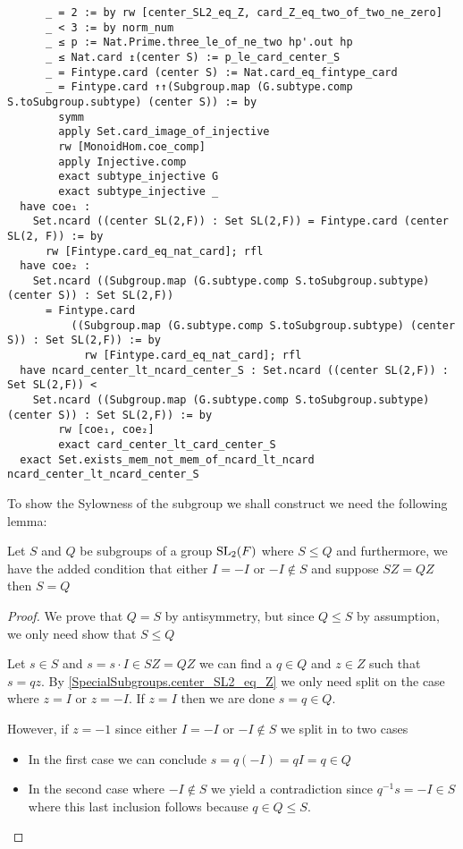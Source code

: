 \begin{tiny}
\begin{verbatim}
      _ = 2 := by rw [center_SL2_eq_Z, card_Z_eq_two_of_two_ne_zero]
      _ < 3 := by norm_num
      _ ≤ p := Nat.Prime.three_le_of_ne_two hp'.out hp
      _ ≤ Nat.card ↥(center S) := p_le_card_center_S
      _ = Fintype.card (center S) := Nat.card_eq_fintype_card
      _ = Fintype.card ↑↑(Subgroup.map (G.subtype.comp S.toSubgroup.subtype) (center S)) := by
        symm
        apply Set.card_image_of_injective
        rw [MonoidHom.coe_comp]
        apply Injective.comp
        exact subtype_injective G
        exact subtype_injective _
  have coe₁ :
    Set.ncard ((center SL(2,F)) : Set SL(2,F)) = Fintype.card (center SL(2, F)) := by
      rw [Fintype.card_eq_nat_card]; rfl
  have coe₂ :
    Set.ncard ((Subgroup.map (G.subtype.comp S.toSubgroup.subtype) (center S)) : Set SL(2,F))
      = Fintype.card
          ((Subgroup.map (G.subtype.comp S.toSubgroup.subtype) (center S)) : Set SL(2,F)) := by
            rw [Fintype.card_eq_nat_card]; rfl
  have ncard_center_lt_ncard_center_S : Set.ncard ((center SL(2,F)) : Set SL(2,F)) <
    Set.ncard ((Subgroup.map (G.subtype.comp S.toSubgroup.subtype) (center S)) : Set SL(2,F)) := by
        rw [coe₁, coe₂]
        exact card_center_lt_card_center_S
  exact Set.exists_mem_not_mem_of_ncard_lt_ncard ncard_center_lt_ncard_center_S
\end{verbatim}
\end{tiny}


To show the Sylowness of the subgroup we shall construct we need the following lemma:

\begin{lemma}
 \label{MaximalAbelianSubgroup.mul_center_inj}
 \leanok
 Let $S$ and $Q$ be subgroups of a group $\operatorname{SL}_2(F)$ where $S \le Q$ and furthermore, we have the added condition that either $I = -I$ or $-I \notin S$ and suppose $SZ = QZ$ then
 $S = Q$
\end{lemma}
\begin{proof}
  \leanok
 We prove that $Q = S$ by antisymmetry, but since $Q \le S$ by assumption, we only need show that $S \le Q$

 Let $s \in S$ and $s = s \cdot I \in S Z = QZ$ we can find a $q \in Q$ and $z \in Z$ such that $s = q z$. By \ref{SpecialSubgroups.center_SL2_eq_Z} 
 we only need split on the case where $z = I$ or $z = -I$. If $z = I$ then we are done $s = q \in Q$. 
 
 However, if $z = -1$ since either $I = -I$ or $-I \notin S$ we split in to two cases
 \begin{itemize}
  \item In the first case we can conclude $s = q (-I) = q I = q \in Q$
  \item In the second case where $-I \notin S$ we yield a contradiction since $q^{-1} s = -I \in S$ where this last inclusion follows because $q \in Q \le S$.
 \end{itemize} 
\end{proof}

